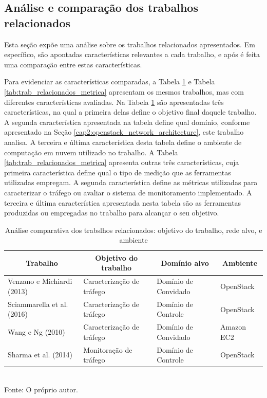 \subsection{Análise e comparação dos trabalhos relacionados}
\label{cap2:comparacao_trabalhos}

Esta seção expõe uma análise sobre os trabalhos relacionados apresentados.
%
Em específico, são apontadas características relevantes a cada trabalho, e após é feita uma comparação entre estas características.
%

Para evidenciar as características comparadas, a Tabela \ref{tab:trab_relacionados_ambiente} e Tabela \ref{tab:trab_relacionados_metrica} apresentam os mesmos trabalhos, mas com diferentes características avaliadas.
%
Na Tabela \ref{tab:trab_relacionados_ambiente} são apresentadas três características, na qual a primeira delas define o objetivo final daquele trabalho.
%
A segunda característica apresentada na tabela define qual domínio, conforme apresentado na Seção \ref{cap2:openstack_network_architecture}, este trabalho analisa.
%
A terceira e última característica desta tabela define o ambiente de computação em nuvem utilizado no trabalho.
%
A Tabela \ref{tab:trab_relacionados_metrica} apresenta outras três características, cuja primeira característica define qual o tipo de medição que as ferramentas utilizadas empregam.
%
A segunda característica define as métricas utilizadas para caracterizar o tráfego ou avaliar o sistema de monitoramento implementado.
%
A terceira e última característica apresentada nesta tabela são as ferramentas produzidas ou empregadas no trabalho para alcançar o seu objetivo.

\begin{table}[!htb]
\centering
\footnotesize
\caption{Análise comparativa dos trabslhos relacionados: objetivo do trabalho, rede alvo, e ambiente}
\begin{tabularx}{\textwidth}{XlXl}
\hline
\multicolumn{1}{c|}{\textbf{Trabalho}} & \multicolumn{1}{c|}{\textbf{Objetivo do trabalho}} & \multicolumn{1}{c|}{\textbf{Domínio alvo}} & \multicolumn{1}{c}{\textbf{Ambiente}} \\ \hline
Venzano e Michiardi (2013) & Caracterização de tráfego & Domínio de Convidado & OpenStack \\
\rowcolor[HTML]{EFEFEF} 
Sciammarella et al. (2016) & Caracterização de tráfego & Domínio de Controle & OpenStack \\
Wang e Ng (2010) & Caracterização de tráfego & Domínio de Convidado & Amazon EC2 \\
\rowcolor[HTML]{EFEFEF} 
Sharma et al. (2014) & Monitoração de tráfego & Domínio de Controle & OpenStack \\ \hline\end{tabularx}
\label{tab:trab_relacionados_ambiente}\\
Fonte: O próprio autor.
\end{table}

